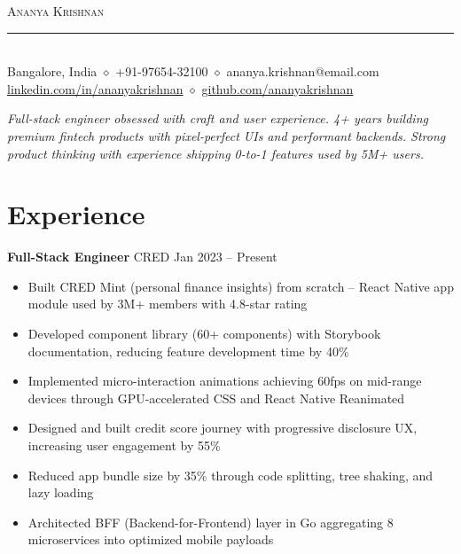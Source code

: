 \documentclass[11pt,a4paper]{article}
\begin{document}
\begin{center}
\vspace{8pt}
{\Huge\scshape Ananya Krishnan}\\[10pt]
{\color{accent}\rule{0.5\textwidth}{0.8pt}}\\[8pt]
{\small Bangalore, India \quad $\diamond$ \quad +91-97654-32100 \quad $\diamond$ \quad ananya.krishnan@email.com}\\[3pt]
{\small \href{https://linkedin.com/in/ananyakrishnan}{linkedin.com/in/ananyakrishnan} \quad $\diamond$ \quad \href{https://github.com/ananyakrishnan}{github.com/ananyakrishnan}}
\end{center}

\vspace{6pt}

\begin{center}
{\itshape Full-stack engineer obsessed with craft and user experience. 4+ years building premium fintech products with pixel-perfect UIs and performant backends. Strong product thinking with experience shipping 0-to-1 features used by 5M+ users.}
\end{center}

\section{Experience}

\textbf{Full-Stack Engineer} \quad CRED \hfill {\color{accent}\small Jan 2023 -- Present}
\begin{itemize}
    \item Built CRED Mint (personal finance insights) from scratch -- React Native app module used by 3M+ members with 4.8-star rating
    \item Developed component library (60+ components) with Storybook documentation, reducing feature development time by 40\%
    \item Implemented micro-interaction animations achieving 60fps on mid-range devices through GPU-accelerated CSS and React Native Reanimated
    \item Designed and built credit score journey with progressive disclosure UX, increasing user engagement by 55\%
    \item Reduced app bundle size by 35\% through code splitting, tree shaking, and lazy loading
    \item Architected BFF (Backend-for-Frontend) layer in Go aggregating 8 microservices into optimized mobile payloads
\end{itemize}
\end{document}
